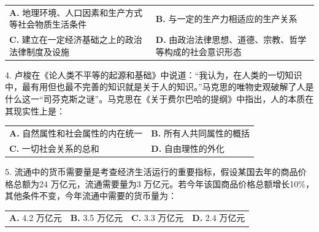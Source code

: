 \documentclass[UTF8,11pt]{ctexart}
\begin{document}
\begin{center}\begin{tabular}{>{\raggedright\arraybackslash}p{\dimexpr(\linewidth-4\tabcolsep)/2\relax}>{\raggedright\arraybackslash}p{\dimexpr(\linewidth-4\tabcolsep)/2\relax}}
\textbf{A.} 地理环境、人口因素和生产方式等社会物质生活条件 & \textbf{B.} 与一定的生产力相适应的生产关系\\[.35em]
\textbf{C.} 建立在一定经济基础之上的政治法律制度及设施 & \textbf{D.} 由政治法律思想、道德、宗教、哲学等构成的社会意识形态\\[.35em]\end{tabular}\end{center}

4. 卢梭在《论人类不平等的起源和基础》中说道：“我认为，在人类的一切知识中，最有用但也最不完善的知识就是关于人的知识。”马克思的唯物史观破解了人是什么这一“司芬克斯之谜”。马克思在《关于费尔巴哈的提纲》中指出，人的本质在其现实性上是：


\begin{center}\begin{tabular}{>{\raggedright\arraybackslash}p{\dimexpr(\linewidth-4\tabcolsep)/2\relax}>{\raggedright\arraybackslash}p{\dimexpr(\linewidth-4\tabcolsep)/2\relax}}
\textbf{A.} 自然属性和社会属性的内在统一 & \textbf{B.} 所有人共同属性的概括\\[.35em]
\textbf{C.} 一切社会关系的总和 & \textbf{D.} 自由理性的外化\\[.35em]\end{tabular}\end{center}

5. 流通中的货币需要量是考查经济生活运行的重要指标，假设某国去年的商品价格总额为24 万亿元，流通需要量为3 万亿元。若今年该国商品价格总额增长10\%，其他条件不变，今年流通中需要的货币量为：


\begin{center}\begin{tabular}{>{\raggedright\arraybackslash}p{\dimexpr(\linewidth-8\tabcolsep)/4\relax}>{\raggedright\arraybackslash}p{\dimexpr(\linewidth-8\tabcolsep)/4\relax}>{\raggedright\arraybackslash}p{\dimexpr(\linewidth-8\tabcolsep)/4\relax}>{\raggedright\arraybackslash}p{\dimexpr(\linewidth-8\tabcolsep)/4\relax}}
\textbf{A.} 4.\allowbreak{}2 万亿元 & \textbf{B.} 3.\allowbreak{}5 万亿元 & \textbf{C.} 3.\allowbreak{}3 万亿元 & \textbf{D.} 2.\allowbreak{}4 万亿元\\[.35em]\end{tabular}\end{center}
\end{document}
